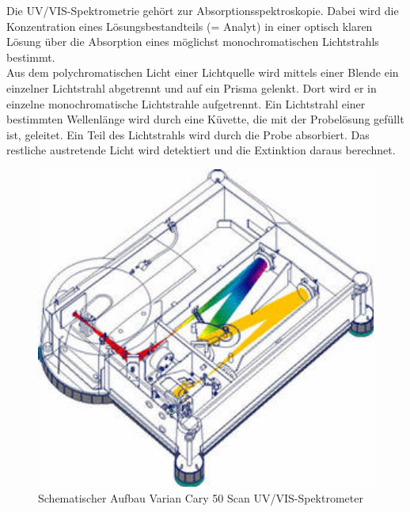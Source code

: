 Die UV/VIS-Spektrometrie gehört zur Absorptionsspektroskopie. Dabei wird die Konzentration
eines Lösungsbestandteils (= Analyt) in einer optisch klaren Lösung über die Absorption
eines möglichst monochromatischen Lichtstrahls bestimmt.\\
Aus dem polychromatischen Licht einer Lichtquelle wird mittels einer Blende ein einzelner
Lichtstrahl abgetrennt und auf ein Prisma gelenkt. Dort wird er in einzelne monochromatische
Lichtstrahle aufgetrennt. Ein Lichtstrahl einer bestimmten Wellenlänge wird
durch eine Küvette, die mit der Probelösung gefüllt ist, geleitet. Ein Teil des Lichtstrahls wird
durch die Probe absorbiert. Das restliche austretende Licht wird detektiert und die Extinktion
daraus berechnet.
\begin{figure}[htbp]
	\centering
		\includegraphics[width=1.00\textwidth]{../Bilder/AufbauSpektrometer.jpg}
	\caption{Schematischer Aufbau Varian Cary 50 Scan UV/VIS-Spektrometer}
	\label{fig:AufbauSpektrometer}
\end{figure}

